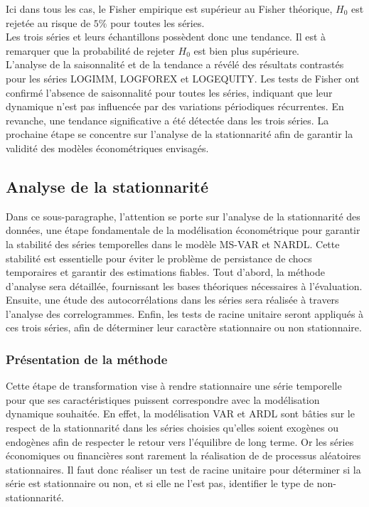 Ici dans tous les cas, le Fisher empirique est supérieur au Fisher théorique, $H_{0}$ est rejetée au risque de $ 5\% $ pour toutes les séries. \\[11pt]
Les trois séries et leurs échantillons possèdent donc une tendance. Il est à remarquer que la probabilité de rejeter $H_{0}$ est bien plus supérieure.\\

L’analyse de la saisonnalité et de la tendance a révélé des résultats contrastés pour les séries LOGIMM, LOGFOREX et LOGEQUITY. Les tests de Fisher ont confirmé l’absence de saisonnalité pour toutes les séries, indiquant que leur dynamique n’est pas influencée par des variations périodiques récurrentes. En revanche, une tendance significative a été détectée dans les trois séries. La prochaine étape se concentre sur l'analyse de la stationnarité afin de garantir la validité des modèles économétriques envisagés.

\subsection{Analyse de la stationnarité}

Dans ce sous-paragraphe, l'attention se porte sur l'analyse de la stationnarité des données, une étape fondamentale de la modélisation économétrique pour garantir la stabilité des séries temporelles dans le modèle MS-VAR et NARDL. Cette stabilité est essentielle pour éviter le problème de persistance de chocs temporaires et garantir des estimations fiables. Tout d'abord, la méthode d'analyse sera détaillée, fournissant les bases théoriques nécessaires à l'évaluation. Ensuite, une étude des autocorrélations dans les séries sera réalisée à travers l'analyse des correlogrammes. Enfin, les tests de racine unitaire seront appliqués à ces trois séries, afin de déterminer leur caractère stationnaire ou non stationnaire.

\subsubsection{Présentation de la méthode}

Cette étape de transformation vise à rendre stationnaire une série temporelle pour que ses caractéristiques puissent correspondre avec la modélisation dynamique souhaitée. En effet, la modélisation VAR et ARDL sont bâties sur le respect de la stationnarité dans les séries choisies qu'elles soient exogènes ou endogènes afin de respecter le retour vers l'équilibre de long terme. Or les séries économiques ou financières sont rarement la réalisation de de processus aléatoires stationnaires. Il faut donc réaliser un test de racine unitaire pour déterminer si la série est stationnaire ou non, et si elle ne l'est pas, identifier le type de non-stationnarité.\\

